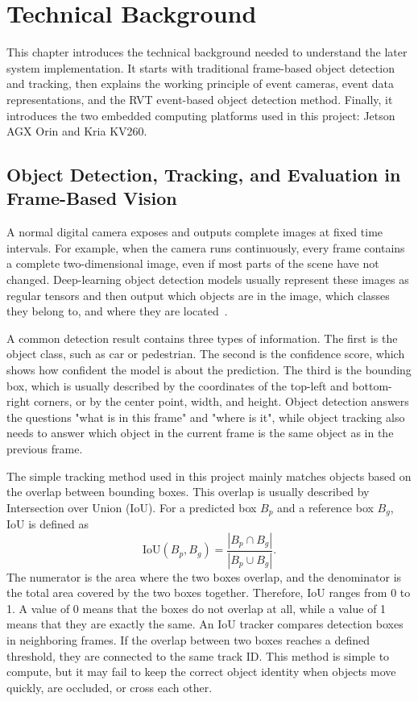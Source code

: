 \chapter{Technical Background}

This chapter introduces the technical background needed to understand the later system implementation. It starts with traditional frame-based object detection and tracking, then explains the working principle of event cameras, event data representations, and the RVT event-based object detection method. Finally, it introduces the two embedded computing platforms used in this project: Jetson AGX Orin and Kria KV260.

\section{Object Detection, Tracking, and Evaluation in Frame-Based Vision}

A normal digital camera exposes and outputs complete images at fixed time intervals. For example, when the camera runs continuously, every frame contains a complete two-dimensional image, even if most parts of the scene have not changed. Deep-learning object detection models usually represent these images as regular tensors and then output which objects are in the image, which classes they belong to, and where they are located~\parencite{szeliski2022}.

A common detection result contains three types of information. The first is the object class, such as car or pedestrian. The second is the confidence score, which shows how confident the model is about the prediction. The third is the bounding box, which is usually described by the coordinates of the top-left and bottom-right corners, or by the center point, width, and height. Object detection answers the questions "what is in this frame" and "where is it", while object tracking also needs to answer which object in the current frame is the same object as in the previous frame.

The simple tracking method used in this project mainly matches objects based on the overlap between bounding boxes. This overlap is usually described by Intersection over Union (IoU). For a predicted box $B_p$ and a reference box $B_g$, IoU is defined as
\begin{equation}
\mathrm{IoU}(B_p,B_g)=\frac{|B_p\cap B_g|}{|B_p\cup B_g|}.
\end{equation}
The numerator is the area where the two boxes overlap, and the denominator is the total area covered by the two boxes together. Therefore, IoU ranges from 0 to 1. A value of 0 means that the boxes do not overlap at all, while a value of 1 means that they are exactly the same. An IoU tracker compares detection boxes in neighboring frames. If the overlap between two boxes reaches a defined threshold, they are connected to the same track ID. This method is simple to compute, but it may fail to keep the correct object identity when objects move quickly, are occluded, or cross each other.

